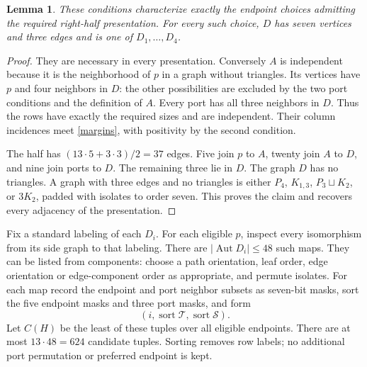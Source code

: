 \documentclass[11pt]{article}
\newtheorem{lemma}[theorem]{Lemma}
\begin{document}
\begin{lemma}\label{roots}
These conditions characterize exactly the endpoint choices admitting
the required right-half presentation. For every such choice, $D$ has
seven vertices and three edges and is one of $D_1,\ldots,D_4$.
\end{lemma}
\begin{proof}
They are necessary in every presentation. Conversely $A$ is independent
because it is the neighborhood of $p$ in a graph without triangles.
Its vertices have $p$ and four neighbors in $D$: the other possibilities
are excluded by the two port conditions and the definition of $A$.
Every port has all three neighbors in $D$. Thus the rows have exactly
the required sizes and are independent. Their column incidences meet
\eqref{margins}, with positivity by the second condition.

The half has $(13\cdot5+3\cdot3)/2=37$ edges. Five join $p$ to $A$,
twenty join $A$ to $D$, and nine join ports to $D$. The remaining three
lie in $D$. The graph $D$ has no triangles. A graph with three edges
and no triangles is either $P_4$, $K_{1,3}$, $P_3\sqcup K_2$, or
$3K_2$, padded with isolates to order seven. This proves the claim and
recovers every adjacency of the presentation.
\end{proof}

Fix a standard labeling of each $D_i$. For each eligible $p$, inspect
every isomorphism from its side graph to that labeling. There are
$|\operatorname{Aut}D_i|\leq48$ such maps. They can be listed from
components: choose a path orientation, leaf order, edge orientation or
edge-component order as appropriate, and permute isolates. For each map
record the endpoint and port neighbor subsets as seven-bit masks, sort
the five endpoint masks and three port masks, and form
\[
 (i,\operatorname{sort}\mathcal T,\operatorname{sort}\mathcal S).
\]
Let $C(H)$ be the least of these tuples over all eligible endpoints.
There are at most $13\cdot48=624$ candidate tuples. Sorting removes
row labels; no additional port permutation or preferred endpoint is kept.
\end{document}
